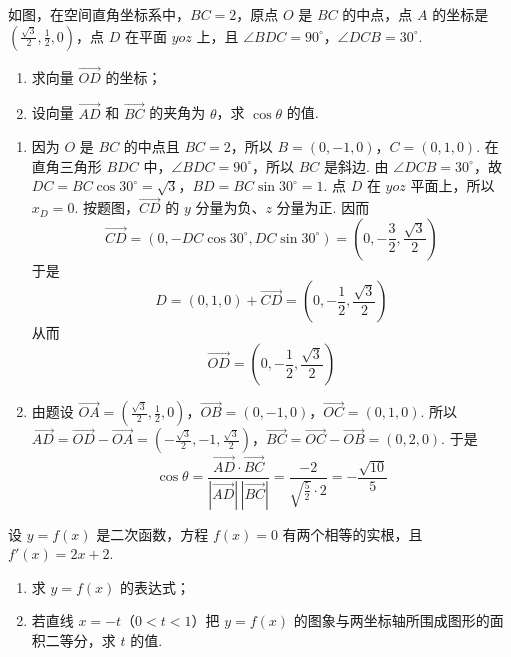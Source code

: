 \setcounter{probnum}{20}
\begin{problem}[B]
如图，在空间直角坐标系中，\(BC=2\)，原点 \(O\) 是 \(BC\) 的中点，点 \(A\) 的坐标是 \(\left(\frac{\sqrt{3}}{2},\frac{1}{2},0\right)\)，点 \(D\) 在平面 \(yoz\) 上，且 \(\angle BDC=90^\circ\)，\(\angle DCB=30^\circ\).

\begin{enumerate}
\item 求向量 \(\overrightarrow{OD}\) 的坐标；
\item 设向量 \(\overrightarrow{AD}\) 和 \(\overrightarrow{BC}\) 的夹角为 \(\theta\)，求 \(\cos\theta\) 的值.
\end{enumerate}

\end{problem}

\begin{solution}
\begin{enumerate}
\item 因为 \(O\) 是 \(BC\) 的中点且 \(BC=2\)，所以
\(B=(0,-1,0)\)，\(C=(0,1,0)\).
在直角三角形 \(BDC\) 中，\(\angle BDC=90^\circ\)，所以 \(BC\) 是斜边. 由 \(\angle DCB=30^\circ\)，故
\(DC=BC\cos30^\circ=\sqrt3\)，\(BD=BC\sin30^\circ=1\).
点 \(D\) 在 \(yoz\) 平面上，所以 \(x_D=0\). 按题图，\(\overrightarrow{CD}\) 的 \(y\) 分量为负、\(z\) 分量为正. 因而
\[
\overrightarrow{CD}
=\left(0,-DC\cos30^\circ,DC\sin30^\circ\right)
=\left(0,-\frac32,\frac{\sqrt3}{2}\right)
\]
于是
\[
D=(0,1,0)+\overrightarrow{CD}
=\left(0,-\frac12,\frac{\sqrt3}{2}\right)
\]
从而
\[
\overrightarrow{OD}=\left(0,-\frac12,\frac{\sqrt3}{2}\right)
\]

\item 由题设
\(\overrightarrow{OA}=\left(\frac{\sqrt3}{2},\frac12,0\right)\)，\(\overrightarrow{OB}=(0,-1,0)\)，\(\overrightarrow{OC}=(0,1,0)\).
所以
\(\overrightarrow{AD}=\overrightarrow{OD}-\overrightarrow{OA} =\left(-\frac{\sqrt3}{2},-1,\frac{\sqrt3}{2}\right)\)，\(\overrightarrow{BC}=\overrightarrow{OC}-\overrightarrow{OB}=(0,2,0)\).
于是
\[
\cos\theta=\frac{\overrightarrow{AD}\cdot\overrightarrow{BC}}{|\overrightarrow{AD}|\,|\overrightarrow{BC}|}
=\frac{-2}{\sqrt{\frac{5}{2}}\cdot2}
=-\frac{\sqrt{10}}{5}
\]
\end{enumerate}
\end{solution}

\begin{problem}[B]
设 \(y=f(x)\) 是二次函数，方程 \(f(x)=0\) 有两个相等的实根，且 \(f'(x)=2x+2\).

\begin{enumerate}
\item 求 \(y=f(x)\) 的表达式；
\item 若直线 \(x=-t\)（\(0<t<1\)）把 \(y=f(x)\) 的图象与两坐标轴所围成图形的面积二等分，求 \(t\) 的值.
\end{enumerate}
\end{problem}

